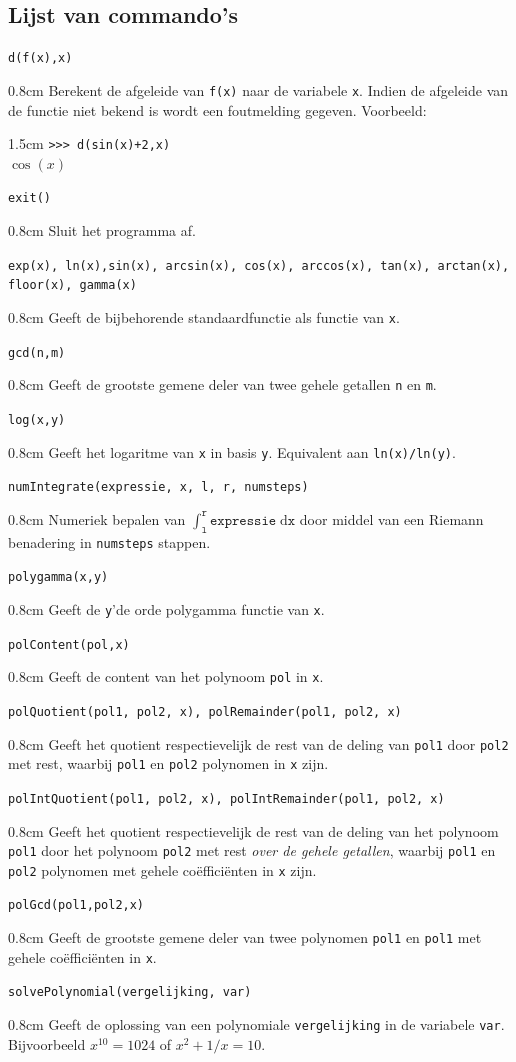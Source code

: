 \documentclass[a4paper]{article}
\newcommand{\com}[2]{\texttt{#1}\mbox{}\vspace{-2ex}\begin{adjustwidth}{0.8cm}{} #2 \end{adjustwidth}}
\newcommand{\ttt}[1]{\texttt{#1}}
\begin{document}
\subsection{Lijst van commando's}
\com{d(f(x),x)}{Berekent de afgeleide van \texttt{f(x)} naar de variabele \texttt{x}. Indien de afgeleide van de functie niet bekend is wordt een foutmelding gegeven. Voorbeeld:\vspace{-0.5ex}}
\begin{adjustwidth}{1.5cm}{}
\texttt{>>> d(sin(x)+2,x)}\\
$\cos(x)$
\end{adjustwidth}
\com{exit()}{Sluit het programma af.}
\com{exp(x), ln(x),sin(x), arcsin(x), cos(x), arccos(x), tan(x), arctan(x), floor(x), gamma(x)}{Geeft de bijbehorende standaardfunctie als functie van \texttt{x}.}
\com{gcd(n,m)}{Geeft de grootste gemene deler van twee gehele getallen \texttt{n} en \texttt{m}.}
\com{log(x,y)}{Geeft het logaritme van \texttt{x} in basis \texttt{y}. Equivalent aan \texttt{ln(x)/ln(y)}.}
\com{numIntegrate(expressie, x, l, r, numsteps)}{Numeriek bepalen van $\int_{\texttt{l}}^\texttt{r} \texttt{expressie} \; \mathrm{d}\texttt{x}$ door middel van een Riemann benadering in \texttt{numsteps} stappen.}
\com{polygamma(x,y)}{Geeft de \texttt{y}'de orde polygamma functie van \texttt{x}.}
\com{polContent(pol,x)}{Geeft de content van het polynoom \texttt{pol} in \texttt{x}.}
\com{polQuotient(pol1, pol2, x), polRemainder(pol1, pol2, x)}{Geeft het quotient respectievelijk de rest van de deling van \texttt{pol1} door \texttt{pol2} met rest, waarbij \texttt{pol1} en \texttt{pol2} polynomen in \texttt{x} zijn.}
\com{polIntQuotient(pol1, pol2, x), polIntRemainder(pol1, pol2, x)}{Geeft het quotient respectievelijk de rest van de deling van het polynoom \texttt{pol1} door het polynoom \texttt{pol2} met rest \textit{over de gehele getallen}, waarbij \texttt{pol1} en \texttt{pol2} polynomen met gehele co\"effici\"enten in \texttt{x} zijn.}
\com{polGcd(pol1,pol2,x)}{Geeft de grootste gemene deler van twee polynomen \texttt{pol1} en \texttt{pol1} met gehele co\"effici\"enten in \texttt{x}.}
\com{solvePolynomial(vergelijking, var)}{Geeft de oplossing van een polynomiale \ttt{vergelijking} in de variabele \ttt{var}. Bijvoorbeeld $x^{10} = 1024$ of $x^2 + 1/x = 10$.}
\end{document}
